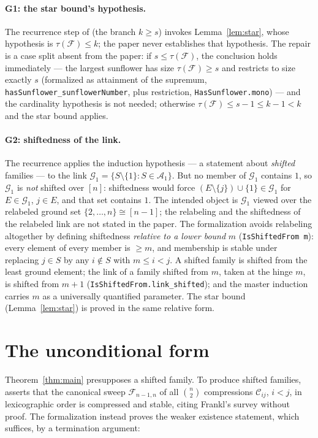 \documentclass[11pt,a4paper]{article}
\theoremstyle{remark}
\newcommand{\cA}{\mathcal{A}}
\newcommand{\cC}{\mathcal{C}}
\newcommand{\cF}{\mathcal{F}}
\newcommand{\cG}{\mathcal{G}}
\begin{document}
\paragraph{G1: the star bound's hypothesis.}
The recurrence step of \cite[Theorem~1]{Mi26} (the branch $k\ge s$)
invokes Lemma~\ref{lem:star}, whose hypothesis is $\tau(\cF)\le k$;
the paper never establishes that hypothesis. The repair is a case
split absent from the paper: if $s\le\tau(\cF)$, the conclusion holds
immediately --- the largest sunflower has size $\tau(\cF)\ge s$ and
restricts to size exactly $s$ (formalized as attainment of the
supremum, \texttt{hasSunflower\_sunflowerNumber}, plus restriction,
\texttt{HasSunflower.mono}) --- and the cardinality hypothesis is not
needed; otherwise $\tau(\cF)\le s-1\le k-1<k$ and the star bound
applies.

\paragraph{G2: shiftedness of the link.}
The recurrence applies the induction hypothesis --- a statement about
\emph{shifted} families --- to the link
$\cG_1=\{S\setminus\{1\}:S\in\cA_1\}$. But no member of $\cG_1$
contains $1$, so $\cG_1$ is \emph{not} shifted over $[n]$: shiftedness
would force $(E\setminus\{j\})\cup\{1\}\in\cG_1$ for $E\in\cG_1$,
$j\in E$, and that set contains $1$. The intended object is $\cG_1$
viewed over the relabeled ground set $\{2,\dots,n\}\cong[n-1]$; the
relabeling and the shiftedness of the relabeled link are not stated in
the paper. The formalization avoids relabeling altogether by defining
shiftedness \emph{relative to a lower bound} $m$
(\texttt{IsShiftedFrom m}): every element of every member is $\ge m$,
and membership is stable under replacing $j\in S$ by any $i\notin S$
with $m\le i<j$. A shifted family is shifted from the least ground
element; the link of a family shifted from $m$, taken at the hinge
$m$, is shifted from $m+1$ (\texttt{IsShiftedFrom.link\_shifted}); and
the master induction carries $m$ as a universally quantified
parameter. The star bound (Lemma~\ref{lem:star}) is proved in the same
relative form.

\section{The unconditional form}\label{sec:uncond}

Theorem~\ref{thm:main} presupposes a shifted family. To produce
shifted families, \cite{Mi26} asserts that the canonical sweep
$\cF_{n-1,n}$ of all $\binom{n}{2}$ compressions $\cC_{ij}$, $i<j$, in
lexicographic order is compressed and stable, citing Frankl's survey
\cite{Fr87} without proof. The formalization instead proves the weaker
existence statement, which suffices, by a termination argument:
\end{document}
